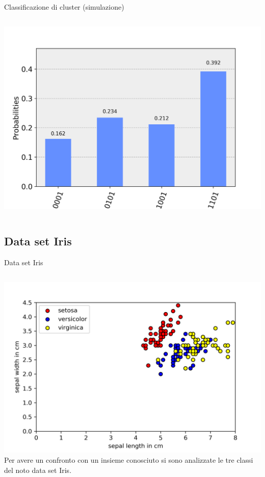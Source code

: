\documentclass{beamer}
\begin{document}
\begin{frame}{Classificazione di cluster (simulazione)}
\begin{columns}
            \includegraphics[width=.9\linewidth]{gfx/Clusters/Simulated/yellow}
        \end{columns}
    \end{frame}

    \subsection{Data set Iris}

    \begin{frame}{Data set Iris}
        \begin{columns}
            \includegraphics[width=\columnwidth]{gfx/iris/iris4features}
            Per avere un confronto con un insieme conosciuto si sono analizzate le tre classi del noto data set Iris. 
        \end{columns}
    \end{frame}
\end{document}
